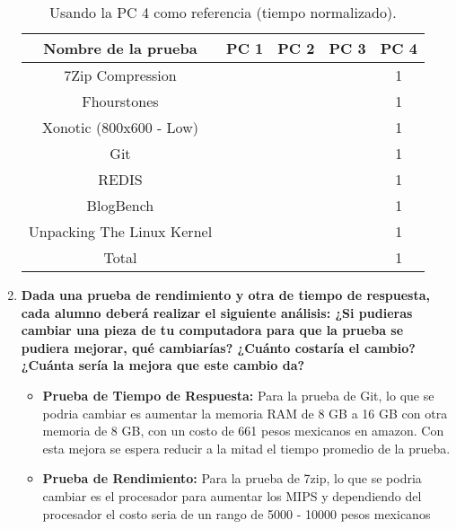 \documentclass[12pt]{article}
\newcommand{\pl}[1]{\item \textbf{ #1 }}
\begin{document}
\begin{enumerate}[label=(\arabic{section}.\arabic{subsection}.\arabic{enumi})]
    \begin{table}[htb]
        \centering
        \begin{tabular}{|c|c|c|c|c|}
        \hline
        \textbf{Nombre de la prueba} & \textbf{PC 1} & \textbf{PC 2} & \textbf{PC 3} & \textbf{PC 4}\\
        \hline
        7Zip Compression & & & & 1 \\
        \hline
        Fhourstones & & & & 1 \\
        \hline
        Xonotic (800x600 - Low) & & & & 1 \\
        \hline
        Git & & & & 1 \\
        \hline
        REDIS & & & & 1 \\
        \hline
        BlogBench & & & & 1 \\
        \hline
        Unpacking The Linux Kernel & & & & 1  \\
        \hline
        Total & & & & 1\\
        \hline
        \end{tabular}
        \caption{Usando la PC 4 como referencia (tiempo normalizado).}
    \end{table}

    \pl{Dada una prueba de rendimiento y otra de tiempo de respuesta, cada alumno deberá realizar el siguiente análisis: ¿Si pudieras cambiar una pieza de tu computadora para que la prueba se pudiera mejorar, qué cambiarías? ¿Cuánto costaría el cambio? ¿Cuánta sería la mejora que este cambio da?}
    
    \begin{itemize}
        \item \textbf{Prueba de Tiempo de Respuesta:} 
        Para la prueba de Git, lo que se podria cambiar es aumentar la memoria RAM de 8 GB a 16 GB con otra memoria de 8 GB, con un costo de 661 pesos mexicanos en amazon.  Con esta mejora se espera reducir a la mitad el tiempo promedio de la prueba.
        \item \textbf{Prueba de Rendimiento:}
        Para la prueba de 7zip, lo que se podria cambiar es el procesador para aumentar los MIPS y dependiendo del procesador el costo seria de un rango de 5000 - 10000 pesos mexicanos
    \end{itemize}
\end{enumerate}

\newpage
\end{document}
